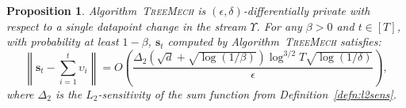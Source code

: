 \documentclass{article}
\theoremstyle{plain}
\newtheorem{proposition}[theorem]{Proposition}
\def \TreeMech {\textsc{TreeMech}\xspace}
\def \eps {\epsilon}
\def \s {\mathbf s}
\begin{document}
\begin{proposition} \label{prop:counter}
Algorithm~\TreeMech is $(\eps,\delta)$-differentially private with respect to a single datapoint change in the stream $\Upsilon$. For any $\beta >0$ and $t \in [T]$, with probability at least $1-\beta$, $\s_t$ computed by Algorithm~\TreeMech satisfies:
$$ \left \|\s_t - \sum_{i=1}^t \upsilon_i \right \| = O \left (\frac{\Delta_2 (\sqrt{d} +\sqrt{\log \left (1/\beta \right )})  \log^{3/2} T\sqrt{\log \left ( 1/\delta \right ) }}{\eps} \right ),$$
where $\Delta_2$ is the $L_2$-sensitivity of the sum function from Definition~\ref{defn:l2sens}.
\end{proposition}





\end{document}
